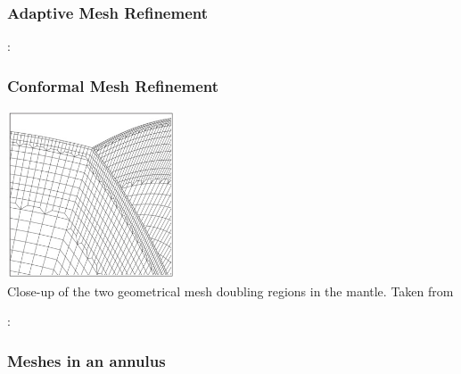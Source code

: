 \subsubsection{Adaptive Mesh Refinement}
 

\Literature: \cite{bugg10}\cite{beck10}\cite{lezh11} \cite[sect 3]{bugs09} \cite{beck10} \cite{dadh07}




\subsubsection{Conformal Mesh Refinement}


\begin{center}
\includegraphics[width=5cm]{images/meshes/kott05}\\
{\captionfont Close-up of the two geometrical mesh doubling regions
in the mantle. Taken from \cite{kott05}}
\end{center}


\Literature: \cite{vaks15}


\subsubsection{Meshes in an annulus}


